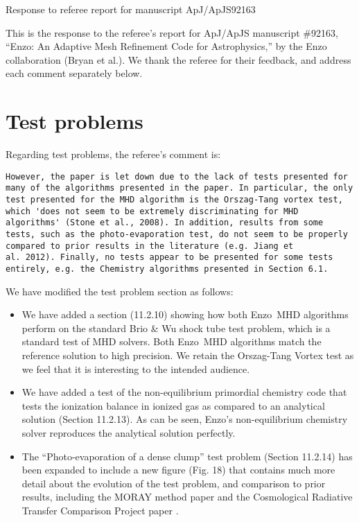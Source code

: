 \documentclass[11pt]{article}
\newcommand{\code}[1]{\textsf{#1}}
\newcommand{\enzo}{\code{Enzo}}
\begin{document}
\begin{center} 
\bfseries{
\begin{large}
Response to referee report for manuscript  ApJ/ApJS92163
\end{large}
}
\end{center}



This is the response to the referee's report for ApJ/ApJS manuscript
\#92163, ``Enzo: An Adaptive Mesh Refinement Code for Astrophysics,''
by the Enzo collaboration (Bryan et al.).  We thank the referee for
their feedback, and address each comment separately below.

\section{Test problems}

Regarding test problems, the referee's comment is:

\begin{verbatim}
However, the paper is let down due to the lack of tests presented for
many of the algorithms presented in the paper. In particular, the only
test presented for the MHD algorithm is the Orszag-Tang vortex test,
which 'does not seem to be extremely discriminating for MHD
algorithms' (Stone et al., 2008). In addition, results from some
tests, such as the photo-evaporation test, do not seem to be properly
compared to prior results in the literature (e.g. Jiang et
al. 2012). Finally, no tests appear to be presented for some tests
entirely, e.g. the Chemistry algorithms presented in Section 6.1.
\end{verbatim}

We have modified the test problem section as follows:

\begin{itemize}
\item We have added a section (11.2.10) showing how both \enzo\ MHD
  algorithms perform on the standard Brio \& Wu shock tube test
  problem, which is a standard test of MHD solvers.  Both \enzo\ MHD
  algorithms match the reference solution to high precision.  We retain the
  Orszag-Tang Vortex test as we feel that it is interesting to the
  intended audience.

\item We have added a test of the non-equilibrium primordial chemistry code that
  tests the ionization balance in ionized gas as compared to an
  analytical solution (Section 11.2.13).  As can be seen, \enzo's
  non-equilibrium chemistry solver  reproduces the analytical solution perfectly.

\item The ``Photo-evaporation of a dense clump'' test problem (Section
  11.2.14) has been expanded to include a new figure (Fig. 18) that
  contains much more detail about the evolution of the test problem,
  and comparison to prior results, including the MORAY method paper
  \citep{Wise11_Moray} and the Cosmological Radiative Transfer
  Comparison Project paper \citep{IlievEtAl2009}.

\end{itemize}
\end{document}
